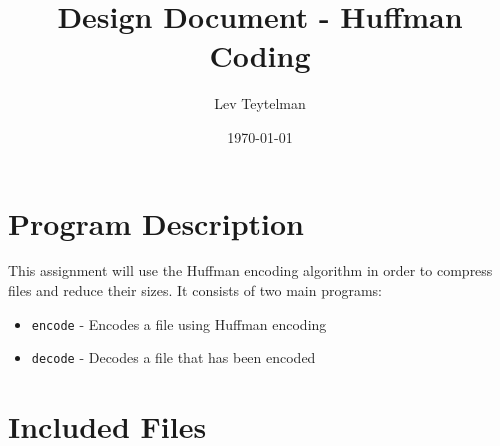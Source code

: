 \documentclass[12pt]{article}
\title{Design Document - Huffman Coding}
\author{Lev Teytelman}
\date{\today}
\begin{document}
\maketitle
\section{Program Description}

This assignment will use the Huffman encoding algorithm in order to compress files and reduce their sizes. It consists of two main programs: \begin{itemize}
    \item \verb|encode| - Encodes a file using Huffman encoding
    \item \verb|decode| - Decodes a file that has been encoded
\end{itemize}
\section{Included Files}
\end{document}
